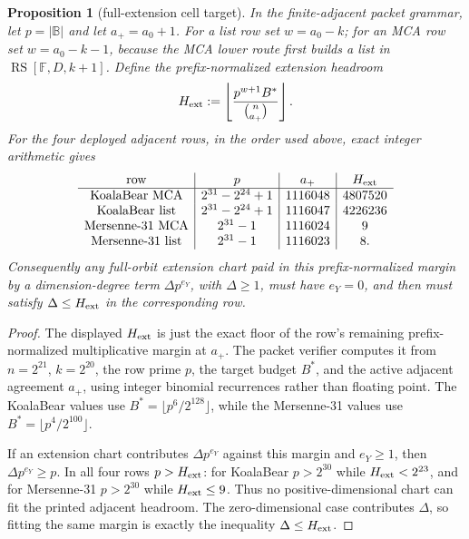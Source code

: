 \documentclass[a4paper,11pt]{amsart}
\newtheorem{proposition}[proposition]{Proposition}
\theoremstyle{remark}
\newcommand{\F}{\mathbb F}
\newcommand{\B}{\mathbb B}
\newcommand{\RS}{\operatorname{RS}}
\begin{document}
\begin{proposition}[full-extension cell target]\label{prop:extension-cell-target}
In the finite-adjacent packet grammar, let \(p=|\B|\) and let \(a_+=a_0+1\).  For a list row set \(w=a_0-k\); for an MCA row set \(w=a_0-k-1\), because the MCA lower route first builds a list in \(\RS[\F,D,k+1]\).  Define the prefix-normalized extension headroom
\[
        H_{\rm ext}
        :=
        \left\lfloor \frac{p^{w+1}B^*}{\binom n{a_+}}\right\rfloor .
\]
For the four deployed adjacent rows, in the order used above, exact integer arithmetic gives
\[
\begin{array}{c|c|c|c}
\text{row} & p & a_+ & H_{\rm ext}\\ \hline
\text{KoalaBear MCA} & 2^{31}-2^{24}+1 & 1116048 & 4807520\\
\text{KoalaBear list} & 2^{31}-2^{24}+1 & 1116047 & 4226236\\
\text{Mersenne-31 MCA} & 2^{31}-1 & 1116024 & 9\\
\text{Mersenne-31 list} & 2^{31}-1 & 1116023 & 8 .
\end{array}
\]
Consequently any full-orbit extension chart paid in this prefix-normalized margin by a dimension-degree term \(\Delta p^{e_Y}\), with \(\Delta\ge1\), must have \(e_Y=0\), and then must satisfy \(\Delta\le H_{\rm ext}\) in the corresponding row.
\end{proposition}

\begin{proof}
The displayed \(H_{\rm ext}\) is just the exact floor of the row's remaining prefix-normalized multiplicative margin at \(a_+\).  The packet verifier computes it from \(n=2^{21}\), \(k=2^{20}\), the row prime \(p\), the target budget \(B^*\), and the active adjacent agreement \(a_+\), using integer binomial recurrences rather than floating point.  The KoalaBear values use \(B^*=\lfloor p^6/2^{128}\rfloor\), while the Mersenne-31 values use \(B^*=\lfloor p^4/2^{100}\rfloor\).

If an extension chart contributes \(\Delta p^{e_Y}\) against this margin and \(e_Y\ge1\), then \(\Delta p^{e_Y}\ge p\).  In all four rows \(p>H_{\rm ext}\): for KoalaBear \(p>2^{30}\) while \(H_{\rm ext}<2^{23}\), and for Mersenne-31 \(p>2^{30}\) while \(H_{\rm ext}\le9\).  Thus no positive-dimensional chart can fit the printed adjacent headroom.  The zero-dimensional case contributes \(\Delta\), so fitting the same margin is exactly the inequality \(\Delta\le H_{\rm ext}\).
\end{proof}
\end{document}
